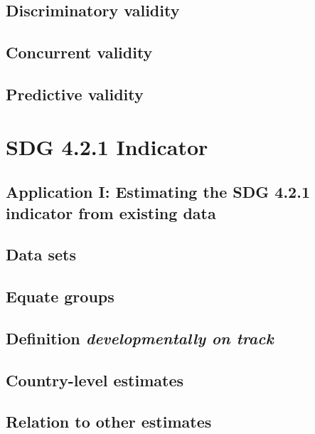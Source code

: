 \documentclass[]{book}
\theoremstyle{definition}
\theoremstyle{definition}
\theoremstyle{definition}
\theoremstyle{remark}
\begin{document}
\section{Discriminatory validity}\label{discriminatory-validity}

\section{Concurrent validity}\label{concurrent-validity}

\section{Predictive validity}\label{predictive-validity}

\chapter{SDG 4.2.1 Indicator}\label{ch:SDGindicator}

\section{Application I: Estimating the SDG 4.2.1 indicator from existing
data}\label{application-i-estimating-the-sdg-4.2.1-indicator-from-existing-data}

\section{Data sets}\label{data-sets}

\section{Equate groups}\label{equate-groups}

\section{\texorpdfstring{Definition \emph{developmentally on
track}}{Definition developmentally on track}}\label{definition-developmentally-on-track}

\section{Country-level estimates}\label{country-level-estimates}

\section{Relation to other estimates}\label{relation-to-other-estimates}
\end{document}
